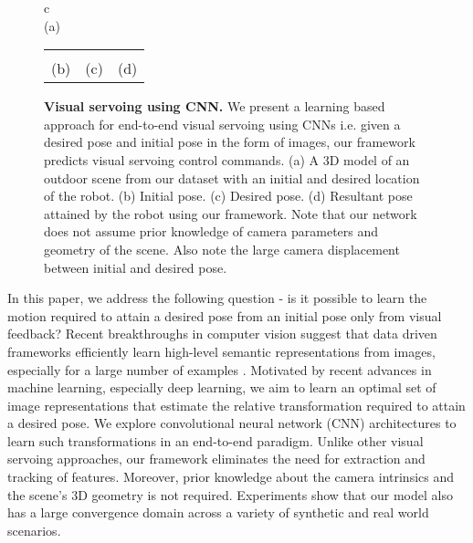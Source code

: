 \documentclass[usletter, 10 pt, conference]{ieeeconf}  %
\begin{document}
\begin{figure}[t!]
\begin{center}
\begin{tabular}{c}
      \\
     (a)\\
     \begin{tabular}{m{2.33cm}m{2.33cm}m{2.33cm}}
     \framebox{\texttt{[image: probstat\_v1\_init.png]}} &
     \framebox{\texttt{[image: probstat\_v1\_desired.png]}} &
     \framebox{\texttt{[image: probstat\_v1\_final.png]}} \\
     \centering (b) & \centering (c) & \centering (d)
     \end{tabular}
\end{tabular}

\caption{\textbf{Visual servoing using CNN.} We present a learning based approach for end-to-end visual servoing using CNNs i.e. given a desired pose and initial pose in the form of images, our framework predicts visual servoing control commands. (a) A $3$D model of an outdoor scene from our dataset with an initial and desired location of the robot.  (b) Initial pose. (c)  Desired pose. (d) Resultant pose attained by the robot using our framework. Note that our network does not assume prior knowledge of camera parameters and geometry of the scene. Also note the large camera displacement between initial and desired pose.}
\label{fig:probstat}
\end{center}
\vspace{-1.75em}
\end{figure}
\indent %
In this paper, we address the following question - is it possible to learn the motion required to attain a desired pose from an initial pose only from visual feedback? Recent breakthroughs in computer vision suggest that data driven frameworks efficiently learn high-level semantic representations from images, especially for a large number of examples \cite{krizhevsky2012imagenet}. Motivated by recent advances in machine learning, especially deep learning, we aim to learn an optimal set of image representations that estimate the relative transformation required to attain a desired pose. We explore convolutional neural network (CNN) architectures to learn such transformations in an end-to-end paradigm. Unlike other visual servoing approaches, our framework eliminates the need for extraction and tracking of features. Moreover, prior knowledge about the camera intrinsics and the scene's $3$D geometry is not required. Experiments show that our model also has a large convergence domain across a variety of synthetic and real world scenarios.\\
\end{document}
